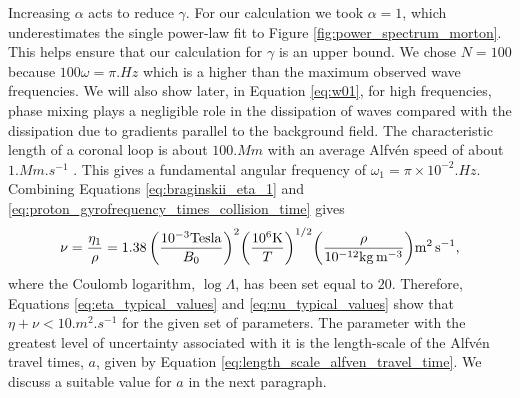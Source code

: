 Increasing $\alpha$ acts to reduce $\gamma$. For our calculation we took $\alpha=1$, which underestimates the single power-law fit to Figure \ref{fig:power_spectrum_morton}. This helps ensure that our calculation for $\gamma$ is an upper bound. We chose $N=100$ because $100\omega = \pi\si{.Hz}$ which is a higher than the maximum observed wave frequencies. We will also show later, in Equation \eqref{eq:w01}, for high frequencies, phase mixing plays a negligible role in the dissipation of waves compared with the dissipation due to gradients parallel to the background field. The characteristic length of a coronal loop is about $100\si{.Mm}$ \citep{O'Neill2005} with an average Alfv\'en speed of about $1\si{.Mm.s^{-1}}$ \citep{McIntosh2011}. This gives a fundamental angular frequency of $\omega_1=\pi\times10^{-2}\si{.Hz}$. Combining Equations \eqref{eq:braginskii_eta_1} and \eqref{eq:proton_gyrofrequency_times_collision_time} gives
\begin{equation}
    \label{eq:nu_typical_values}
    \nu=\frac{\eta_1}{\rho} = 1.38\,\qty(\frac{10^{-3}\si{.Tesla}}{B_0})^2\qty(\frac{10^6\si{.K}}{T})^{1/2}\qty(\frac{\rho}{10^{-12}\si{.kg.m^{-3}}})\si{.m^2.s^{-1}},
\end{equation}
where the Coulomb logarithm, $\log\Lambda$, has been set equal to $20$. Therefore, Equations \eqref{eq:eta_typical_values} and \eqref{eq:nu_typical_values} show that $\eta+\nu<10\si{.m^2.s^{-1}}$ for the given set of parameters. The parameter with the greatest level of uncertainty associated with it is the length-scale of the Alfv\'en travel times, $a$, given by Equation \eqref{eq:length_scale_alfven_travel_time}. We discuss a suitable value for $a$ in the next paragraph. 

